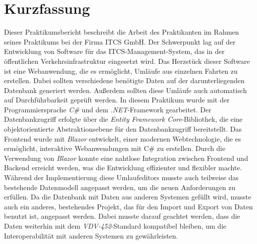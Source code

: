 \chapter{Kurzfassung}%
Dieser Praktikumsbericht beschreibt die Arbeit des Praktikanten im Rahmen seines Praktikums bei der Firma ITCS GmbH. Der Schwerpunkt lag auf der Entwicklung
von Software für das ITCS-Management-System, das in der öffentlichen Verkehrsinfrastruktur eingesetzt wird. Das Herzstück dieser Software ist eine Webanwendung,
die es ermöglicht, Umläufe aus einzelnen Fahrten zu erstellen. Dabei sollten verschiedene benötigte Daten auf der darunterliegenden Datenbank generiert werden.
Außerdem sollten diese Umläufe auch automatisch auf Durchführbarkeit geprüft werden.
In diesem Praktikum wurde mit der Programmiersprache \emph{C\#} und dem \emph{.NET}-Framework gearbeitet. Der Datenbankzugriff erfolgte über die \emph{Entity Framework Core}-Bibliothek, 
die eine objektorientierte Abstraktionsebene für den Datenbankzugriff bereitstellt. Das Frontend wurde mit \emph{Blazor} entwickelt, einer modernen Webtechnologie, 
die es ermöglicht, interaktive Webanwendungen mit C\# zu erstellen. Durch die Verwendung von \emph{Blazor} konnte eine nahtlose Integration zwischen Frontend und Backend erreicht werden,
was die Entwicklung effizienter und flexibler machte.
Während der Implementierung diese Umlaufeditors musste auch teilweise das bestehende Datenmodell angepasst werden, um die neuen Anforderungen zu erfüllen. 
Da die Datenbank mit Daten aus anderen Systemen gefüllt wird, musste auch ein anderes, bestehendes Projekt, das für den Import und Export von Daten benutzt ist, angepasst werden.
Dabei musste darauf geachtet werden, dass die Daten weiterhin mit dem \emph{VDV-452}-Standard kompatibel bleiben, um die Interoperabilität mit anderen Systemen zu gewährleisten.